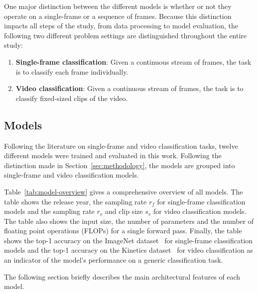 \documentclass[a4paper]{article}
\begin{document}
One major distinction between the different models is whether or not they
operate on a single-frame or a sequence of frames. Because this distinction
impacts all steps of the study, from data processing to model evaluation, the
following two different problem settings are distinguished throughout the entire
study:

\begin{enumerate}

\item \textbf{Single-frame classification}: Given a continuous stream of frames,
  the task is to classify each frame individually.

\item \textbf{Video classification}: Given a continuous stream of frames, the
  task is to classify fixed-sized clips of the video.

\end{enumerate}


\subsection{Models} %
\label{sub:models}


Following the literature on single-frame and video classification tasks, twelve
different models were trained and evaluated in this work. Following the
distinction made in Section~\ref{sec:methodology}, the models are grouped into
single-frame and video classification models. 

Table~\ref{tab:model-overview} gives a comprehensive overview of all models. The
table shows the release year, the sampling rate $r_f$ for single-frame
classification models and the sampling rate $r_v$ and clip size $s_v$ for video
classification models. The table also shows the input size, the number of
parameters and the number of floating point operations (FLOPs) for a single
forward pass. Finally, the table shows the top-1 accuracy on the ImageNet
dataset~\cite{imagenet} for single-frame classification models and the top-1
accuracy on the Kinetics dataset~\cite{kinetics} for video classification as an
indicator of the model's performance on a generic classification task.

The following section briefly describes the main architectural features of each
model.

\end{document}
